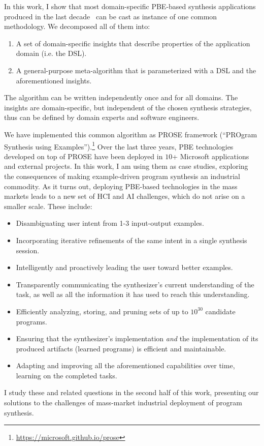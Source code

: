 In this work, I show that most domain-specific PBE-based synthesis applications produced in the last
decade~\cite{smartedit,miller:colorful,flashfill,flashextract,flashrelate,flashnormalize,vldb12:semantic,andersen:procedural,pldi15:swarat,pldi15:osera,harris2011spreadsheet,singh2012synthesizing}
can be cast as instance of one common methodology.
We decomposed all of them into:
\begin{enumerate}[nosep]
    \item A set of domain-specific insights that describe properties of the application domain (i.e. the DSL).
    \item A general-purpose meta-algorithm that is parameterized with a DSL and the aforementioned insights.
\end{enumerate}
The algorithm can be written independently once and for all domains.
The insights are domain-specific, but independent of the chosen synthesis strategies, thus can be defined by
domain experts and software engineers.

We have implemented this common algorithm as PROSE framework (``PROgram Synthesis using
Examples'').\footnote{\url{https://microsoft.github.io/prose}}
Over the last three years, PBE technologies developed on top of PROSE have been deployed in $10$+ Microsoft applications
and external projects.
In this work, I am using them as case studies, exploring the consequences of making example-driven program synthesis an
industrial commodity.
As it turns out, deploying PBE-based technologies in the mass markets leads to a new set of HCI and AI challenges, which
do not arise on a smaller scale.
These include:
\begin{itemize}[nosep]
    \item Disambiguating user intent from 1-3 input-output examples.
    \item Incorporating iterative refinements of the same intent in a single synthesis session.
    \item Intelligently and proactively leading the user toward better examples.
    \item Transparently communicating the synthesizer's current understanding of the task, as well as all the
        information it has used to reach this understanding.
    \item Efficiently analyzing, storing, and pruning sets of up to $10^{30}$ candidate programs.
    \item Ensuring that the synthesizer's implementation \emph{and} the implementation of its produced artifacts
        (learned programs) is efficient and maintainable.
    \item Adapting and improving all the aforementioned capabilities over time, learning on the completed tasks.
\end{itemize}
I study these and related questions in the second half of this work, presenting our solutions to the challenges of
mass-market industrial deployment of program synthesis.

